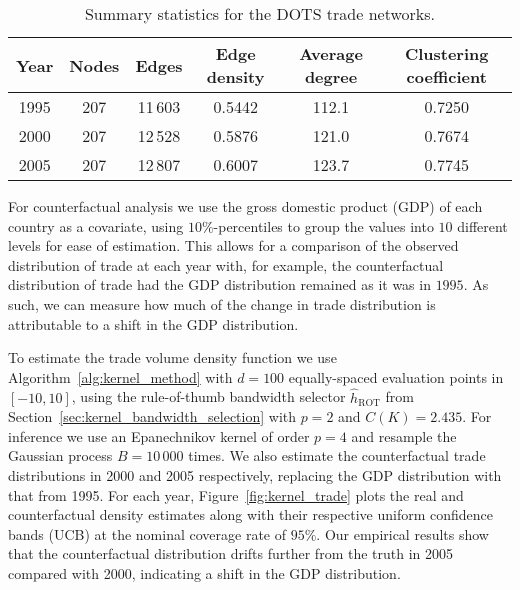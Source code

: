 \documentclass[11pt,lof]{puthesis}
\DeclareMathOperator{\ROT}{ROT}
\theoremstyle{break}
\theoremstyle{proof}
\begin{document}
\begin{table}[b!]
  \centering
  \begin{tabular}{|c|c|c|c|c|c|}
    \hline
    Year & Nodes & Edges & Edge density & Average degree
    & Clustering coefficient \\
    \hline
    1995 & 207 & 11\,603 & 0.5442 & 112.1 & 0.7250 \\
    2000 & 207 & 12\,528 & 0.5876 & 121.0 & 0.7674 \\
    2005 & 207 & 12\,807 & 0.6007 & 123.7 & 0.7745 \\
    \hline
  \end{tabular}
  \caption[Summary statistics for the DOTS trade networks]{
  Summary statistics for the DOTS trade networks.}
  \label{tab:kernel_trade_network_stats}
\end{table}

For counterfactual analysis we use the gross domestic product (GDP) of each
country as a covariate, using $10\%$-percentiles to group the values into $10$
different levels for ease of estimation. This allows for a comparison of the
observed distribution of trade at each year with, for example, the
counterfactual distribution of trade had the GDP distribution remained as it
was in $1995$. As such, we can measure how much of the change in trade
distribution is attributable to a shift in the GDP distribution.

To estimate the trade volume density function we use
Algorithm~\ref{alg:kernel_method}
with $d=100$ equally-spaced evaluation points in $[-10,10]$, using the
rule-of-thumb bandwidth selector $\hat h_{\ROT}$ from
Section~\ref{sec:kernel_bandwidth_selection} with $p=2$ and $C(K) = 2.435$. For
inference we use an Epanechnikov kernel of order $p=4$ and resample the
Gaussian process $B = 10\,000$ times. We also estimate the counterfactual trade
distributions in 2000 and 2005 respectively, replacing the GDP distribution
with that from 1995. For each year, Figure~\ref{fig:kernel_trade} plots the
real and
counterfactual density estimates along with their respective uniform confidence
bands (UCB) at the nominal coverage rate of $95\%$. Our empirical results show
that the counterfactual distribution drifts further from the truth in 2005
compared with 2000, indicating a shift in the GDP distribution.
\end{document}

